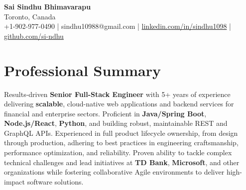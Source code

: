 \documentclass[letterpaper,11pt]{article}
\begin{document}
\begin{center}
  {\Large \textbf{Sai Sindhu Bhimavarapu}} \\
  Toronto, Canada \\
  +1-902-977-0490 \enspace | \enspace sindhu10988@gmail.com \enspace | \enspace \href{https://www.linkedin.com/in/sindhu1098/}{linkedin.com/in/sindhu1098} \enspace | \enspace \href{https://github.com/si-ndhu}{github.com/si-ndhu}
\end{center}

\section{Professional Summary}
  \begin{itemize}[leftmargin=0.15in, label={}]
    \small{\item{
     Results-driven \textbf{Senior Full-Stack Engineer} with 5+ years of experience delivering \textbf{scalable}, cloud-native web applications and backend services for financial and enterprise sectors. Proficient in \textbf{Java/Spring Boot}, \textbf{Node.js/React}, \textbf{Python}, and building robust, maintainable REST and GraphQL APIs. Experienced in full product lifecycle ownership, from design through production, adhering to best practices in engineering craftsmanship, performance optimization, and reliability. Proven ability to tackle complex technical challenges and lead initiatives at \textbf{TD Bank}, \textbf{Microsoft}, and other organizations while fostering collaborative Agile environments to deliver high-impact software solutions.
    }}
  \end{itemize}
\vspace{-16pt}

\end{document}
